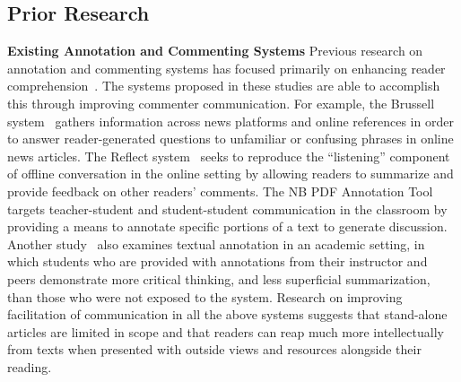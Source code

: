\subsection{Prior Research}
\textbf{Existing Annotation and Commenting Systems}
Previous research on annotation and commenting systems has focused primarily on enhancing reader comprehension~\cite{NewsInterfaces,Reflect,NB,AnnotationsStudents}. The systems proposed in these studies are able to accomplish this through improving commenter communication. For example, the Brussell system~\cite{NewsInterfaces} gathers information across news platforms and online references in order to answer reader-generated questions to unfamiliar or confusing phrases in online news articles. The Reflect system~\cite{Reflect} seeks to reproduce the ``listening'' component of offline conversation in the online setting by allowing readers to summarize and provide feedback on other readers' comments. The NB PDF Annotation Tool~\cite{NB} targets teacher-student and student-student communication in the classroom by providing a means to annotate specific portions of a text to generate discussion. Another study~\cite{AnnotationsStudents} also examines textual annotation in an academic setting, in which students who are provided with annotations from their instructor and peers demonstrate more critical thinking, and less superficial summarization, than those who were not exposed to the system. Research on improving facilitation of communication in all the above systems suggests that stand-alone articles are limited in scope and that readers can reap much more intellectually from texts when presented with outside views and resources alongside their reading.

